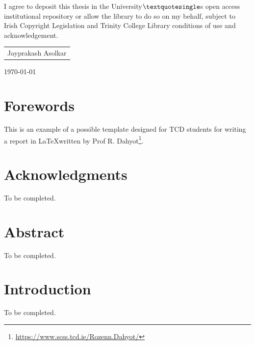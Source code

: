 \documentclass[english,a4paper,11pt,oneside,onecolumn]{book}
\begin{document}
\noindent I agree to deposit this thesis in the University$\textquotesingle$s open access institutional repository or
allow the library to do so on my behalf, subject to Irish Copyright Legislation and
Trinity College Library conditions of use and acknowledgement.


\vspace{3cm}
\begin{flushright}

\begin{tabular}{l}
\hline
Jayprakash Asolkar\\
\end{tabular}

\vspace{0.5cm}

\today
\end{flushright}



\chapter*{Forewords}

This is an example  of a possible  template designed for TCD students for writing a report in \LaTeX written by  Prof R. Dahyot\footnote{\url{https://www.scss.tcd.ie/Rozenn.Dahyot/}}. 

\chapter*{Acknowledgments}

To be completed.

\chapter*{Abstract}
To be completed.

\tableofcontents

\listoffigures

\listoftables


%

\chapter{Introduction} 

To be completed.
\end{document}
